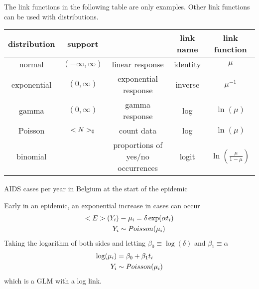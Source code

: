 The link functions in the following table are only examples. Other link functions can be used with distributions.
\begin{center}
	\begin{tabular}{c|c|c|c|c}
		\textbf{distribution} & \textbf{support} & \text{use} & \textbf{link name} & \textbf{link function} \\
		\hline
		normal & $(-\infty,\infty)$ & linear response & identity & $\mu$ \\
		exponential & $(0,\infty)$ & exponential response & inverse & $\mu^{-1}$ \\
		gamma & $(0,\infty)$ & gamma response & log & $\ln(\mu)$ \\
		Poisson & $\natur_0$ & count data & log & $\ln(\mu)$ \\
		binomial & & proportions of yes/no occurrences & logit & $\ln\left(\frac{\mu}{1-\mu}\right)$
	\end{tabular}
\end{center}

\begin{example}
	AIDS cases per year in Belgium at the start of the epidemic
	\begin{center}
	\end{center}
	Early in an epidemic, an exponential increase in cases can occur
	\begin{align}
		\mathbb{E}(Y_i) &\equiv \mu_i = \delta\exp(\alpha t_i) \notag \\
		Y_i &\sim Poisson(\mu_i) \notag
	\end{align}
	Taking the logarithm of both sides and letting $\beta_0\equiv\log(\delta)$ and $\beta_1\equiv\alpha$
	\begin{align}
		\log(\mu_i) &= \beta_0 + \beta_1 t_i \notag \\
		Y_i &\sim Poisson(\mu_i) \notag
	\end{align}
	which is a GLM with a log link.
\end{example}

